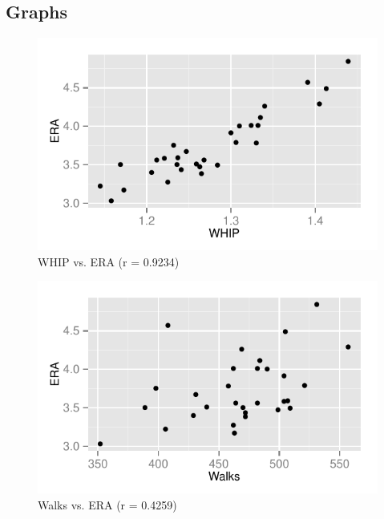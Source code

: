 \documentclass[landscape]{article}
\begin{document}
  \subsection{Graphs} %
  
  \begin{figure}[H]
    \centering
    \includegraphics[scale = 0.9]{figures/mlb/whip_vs_era.pdf}
    \caption{WHIP vs. ERA (r = 0.9234)}
  \end{figure}

  \begin{figure}[H]
    \centering
    \includegraphics[scale = 0.9]{figures/mlb/bb_vs_era.pdf}
    \caption{Walks vs. ERA (r = 0.4259)}
  \end{figure}
\end{document}
